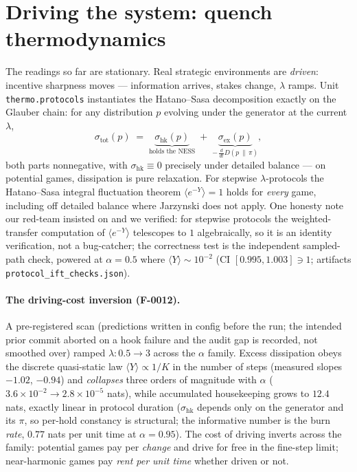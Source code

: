\section{Driving the system: quench thermodynamics}
\label{sec:protocols}

The readings so far are stationary. Real strategic environments are
\emph{driven}: incentive sharpness moves — information arrives, stakes
change, $\lambda$ ramps. Unit \texttt{thermo.protocols} instantiates the
Hatano--Sasa decomposition \citep{hatanosasa2001, espositovdb2010} exactly on
the Glauber chain: for any distribution $p$ evolving under the generator at
the current $\lambda$,
\[
\sigma_{\mathrm{tot}}(p) \;=\; \underbrace{\sigma_{\mathrm{hk}}(p)}_{\text{holds the NESS}}
\;+\; \underbrace{\sigma_{\mathrm{ex}}(p)}_{-\,\tfrac{d}{dt} D(p\,\|\,\pi)},
\]
both parts nonnegative, with $\sigma_{\mathrm{hk}} \equiv 0$ precisely under
detailed balance — on potential games, dissipation is pure relaxation. For
stepwise $\lambda$-protocols the Hatano--Sasa integral fluctuation theorem
$\langle e^{-Y}\rangle = 1$ holds for \emph{every} game, including off
detailed balance where Jarzynski does not apply. One honesty note our
red-team insisted on and we verified: for stepwise protocols the
weighted-transfer computation of $\langle e^{-Y}\rangle$ telescopes to $1$
algebraically, so it is an identity verification, not a bug-catcher; the
correctness test is the independent sampled-path check, powered at
$\alpha = 0.5$ where $\langle Y\rangle \sim 10^{-2}$ (CI $[0.995, 1.003]
\ni 1$; artifacts \texttt{protocol\_ift\_checks.json}).

\paragraph{The driving-cost inversion (F-0012).} A pre-registered scan
(predictions written in config before the run; the intended prior commit
aborted on a hook failure and the audit gap is recorded, not smoothed over)
ramped $\lambda: 0.5 \to 3$ across the $\alpha$ family. Excess dissipation
obeys the discrete quasi-static law $\langle Y\rangle \propto 1/K$ in the
number of steps (measured slopes $-1.02$, $-0.94$) and \emph{collapses}
three orders of magnitude with $\alpha$ ($3.6\times10^{-2} \to
2.8\times10^{-5}$ nats), while accumulated housekeeping grows to $12.4$ nats,
exactly linear in protocol duration ($\sigma_{\mathrm{hk}}$ depends only on
the generator and its $\pi$, so per-hold constancy is structural; the
informative number is the burn \emph{rate}, $0.77$ nats per unit time at
$\alpha = 0.95$). The cost of driving inverts across the family: potential
games pay per \emph{change} and drive for free in the fine-step limit;
near-harmonic games pay \emph{rent per unit time} whether driven or not.

